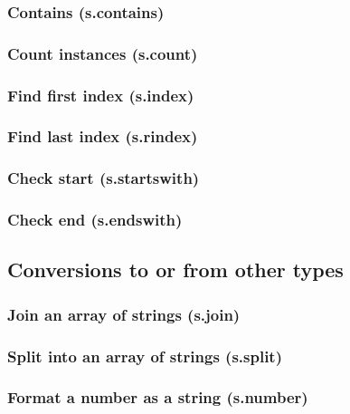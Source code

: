 \documentclass{article}
\theoremstyle{definition}
\begin{document}
\subsubsection{Contains (s.contains)}

\subsubsection{Count instances (s.count)}

\subsubsection{Find first index (s.index)}

\subsubsection{Find last index (s.rindex)}

\subsubsection{Check start (s.startswith)}

\subsubsection{Check end (s.endswith)}

\subsection{Conversions to or from other types}

\subsubsection{Join an array of strings (s.join)}

\subsubsection{Split into an array of strings (s.split)}

\subsubsection{Format a number as a string (s.number)}
\end{document}
